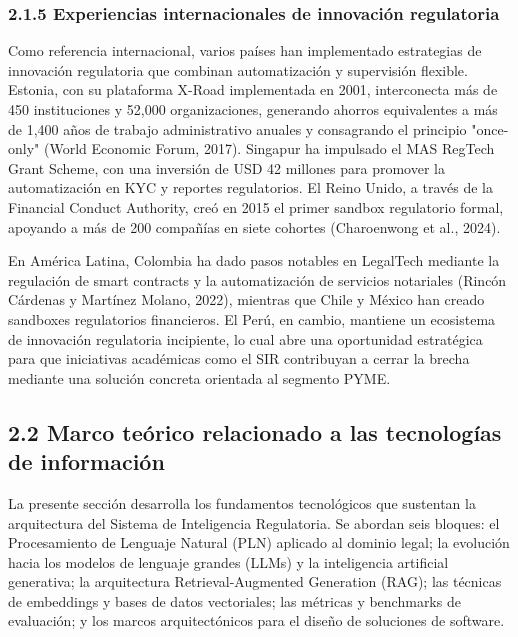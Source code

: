 \documentclass[12pt,a4paper,oneside]{report}
\begin{document}
\subsubsection{2.1.5 Experiencias internacionales de innovación
regulatoria}\label{experiencias-internacionales-de-innovaciuxf3n-regulatoria}

Como referencia internacional, varios países han implementado
estrategias de innovación regulatoria que combinan automatización y
supervisión flexible. Estonia, con su plataforma X-Road implementada en
2001, interconecta más de 450 instituciones y 52,000 organizaciones,
generando ahorros equivalentes a más de 1,400 años de trabajo
administrativo anuales y consagrando el principio "once-only" (World
Economic Forum, 2017). Singapur ha impulsado el MAS RegTech Grant
Scheme, con una inversión de USD 42 millones para promover la
automatización en KYC y reportes regulatorios. El Reino Unido, a través
de la Financial Conduct Authority, creó en 2015 el primer sandbox
regulatorio formal, apoyando a más de 200 compañías en siete cohortes
(Charoenwong et al., 2024).

En América Latina, Colombia ha dado pasos notables en LegalTech mediante
la regulación de smart contracts y la automatización de servicios
notariales (Rincón Cárdenas y Martínez Molano, 2022), mientras que Chile
y México han creado sandboxes regulatorios financieros. El Perú, en
cambio, mantiene un ecosistema de innovación regulatoria incipiente, lo
cual abre una oportunidad estratégica para que iniciativas académicas
como el SIR contribuyan a cerrar la brecha mediante una solución
concreta orientada al segmento PYME.

\subsection{2.2 Marco teórico relacionado a las tecnologías de
información}\label{marco-teuxf3rico-relacionado-a-las-tecnologuxedas-de-informaciuxf3n}

La presente sección desarrolla los fundamentos tecnológicos que
sustentan la arquitectura del Sistema de Inteligencia Regulatoria. Se
abordan seis bloques: el Procesamiento de Lenguaje Natural (PLN)
aplicado al dominio legal; la evolución hacia los modelos de lenguaje
grandes (LLMs) y la inteligencia artificial generativa; la arquitectura
Retrieval-Augmented Generation (RAG); las técnicas de embeddings y bases
de datos vectoriales; las métricas y benchmarks de evaluación; y los
marcos arquitectónicos para el diseño de soluciones de software.
\end{document}
